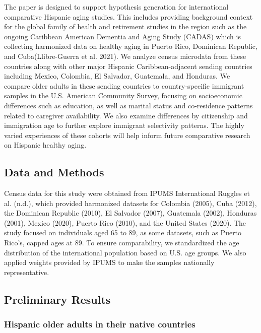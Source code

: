 \documentclass[
]{article}
\begin{document}
The paper is designed to support hypothesis generation for international
comparative Hispanic aging studies. This includes providing background
context for the global family of health and retirement studies in the
region such as the ongoing Caribbean American Dementia and Aging Study
(CADAS) which is collecting harmonized data on healthy aging in Puerto
Rico, Dominican Republic, and Cuba(Llibre-Guerra et al. 2021). We
analyze census microdata from these countries along with other major
Hispanic Caribbean-adjacent sending countries including Mexico,
Colombia, El Salvador, Guatemala, and Honduras. We compare older adults
in these sending countries to country-specific immigrant samples in the
U.S. American Community Survey, focusing on socioeconomic differences
such as education, as well as marital status and co-residence patterns
related to caregiver availability. We also examine differences by
citizenship and immigration age to further explore immigrant selectivity
patterns. The highly varied experiences of these cohorts will help
inform future comparative research on Hispanic healthy aging.

\subsection{Data and Methods}\label{data-and-methods}

Census data for this study were obtained from IPUMS International
Ruggles et al. (n.d.), which provided harmonized datasets for Colombia
(2005), Cuba (2012), the Dominican Republic (2010), El Salvador (2007),
Guatemala (2002), Honduras (2001), Mexico (2020), Puerto Rico (2010),
and the United States (2020). The study focused on individuals aged 65
to 89, as some datasets, such as Puerto Rico's, capped ages at 89. To
ensure comparability, we standardized the age distribution of the
international population based on U.S. age groups. We also applied
weights provided by IPUMS to make the samples nationally representative.

\subsection{Preliminary Results}\label{preliminary-results}

\subsubsection{Hispanic older adults in their native
countries}\label{hispanic-older-adults-in-their-native-countries}
\end{document}
